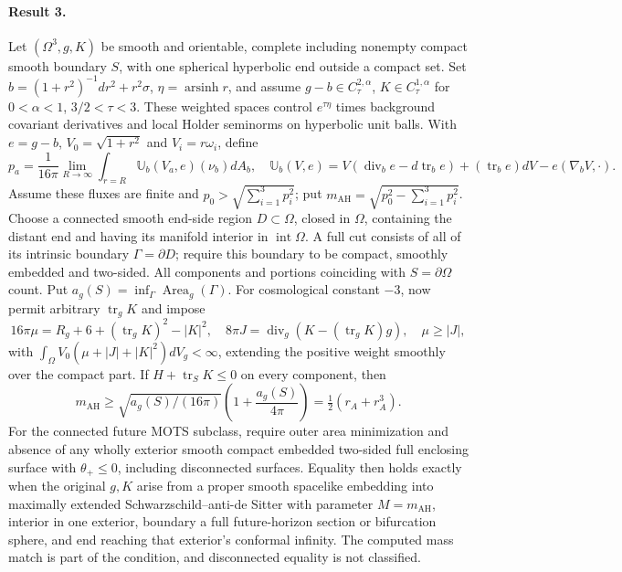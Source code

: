 \documentclass[11pt]{article}
\begin{document}
\paragraph{Result 3.} Let $(\Omega^3,g,K)$ be smooth and orientable, complete including nonempty compact smooth boundary $S$, with one spherical hyperbolic end outside a compact set. Set $b=(1+r^2)^{-1}dr^2+r^2\sigma$, $\eta=\operatorname{arsinh}r$, and assume $g-b\in C^{2,\alpha}_\tau$, $K\in C^{1,\alpha}_\tau$ for $0<\alpha<1$, $3/2<\tau<3$. These weighted spaces control $e^{\tau\eta}$ times background covariant derivatives and local Holder seminorms on hyperbolic unit balls. With $e=g-b$, $V_0=\sqrt{1+r^2}$ and $V_i=r\omega_i$, define
\[
 p_a=\frac1{16\pi}\lim_{R\to\infty}\int_{r=R}\mathbb U_b(V_a,e)(\nu_b)dA_b,\quad
 \mathbb U_b(V,e)=V(\operatorname{div}_be-d\operatorname{tr}_be)
 +(\operatorname{tr}_be)dV-e(\nabla_bV,\cdot).
\]
Assume these fluxes are finite and $p_0>\sqrt{\sum_{i=1}^3p_i^2}$; put $m_{\mathrm{AH}}=\sqrt{p_0^2-\sum_{i=1}^3p_i^2}$. Choose a connected smooth end-side region $D\subset\Omega$, closed in $\Omega$, containing the distant end and having its manifold interior in $\operatorname{int}\Omega$. A full cut consists of all of its intrinsic boundary $\Gamma=\partial D$; require this boundary to be compact, smoothly embedded and two-sided. All components and portions coinciding with $S=\partial\Omega$ count. Put $a_g(S)=\inf_\Gamma\operatorname{Area}_g(\Gamma)$. For cosmological constant $-3$, now permit arbitrary $\operatorname{tr}_gK$ and impose
\[
 16\pi\mu=R_g+6+(\operatorname{tr}_gK)^2-|K|^2,\quad
 8\pi J=\operatorname{div}_g(K-(\operatorname{tr}_gK)g),\quad\mu\ge|J|,
\]
with $\int_\Omega V_0(\mu+|J|+|K|^2)dV_g<\infty$, extending the positive weight smoothly over the compact part. If $H+\operatorname{tr}_SK\le0$ on every component, then
\[
 m_{\mathrm{AH}}\ge\sqrt{a_g(S)/(16\pi)}\left(1+\frac{a_g(S)}{4\pi}\right)=\tfrac12(r_A+r_A^3).
\]
For the connected future MOTS subclass, require outer area minimization and absence of any wholly exterior smooth compact embedded two-sided full enclosing surface with $\theta_+\le0$, including disconnected surfaces. Equality then holds exactly when the original $g,K$ arise from a proper smooth spacelike embedding into maximally extended Schwarzschild--anti-de Sitter with parameter $M=m_{\mathrm{AH}}$, interior in one exterior, boundary a full future-horizon section or bifurcation sphere, and end reaching that exterior's conformal infinity. The computed mass match is part of the condition, and disconnected equality is not classified.
\end{document}
